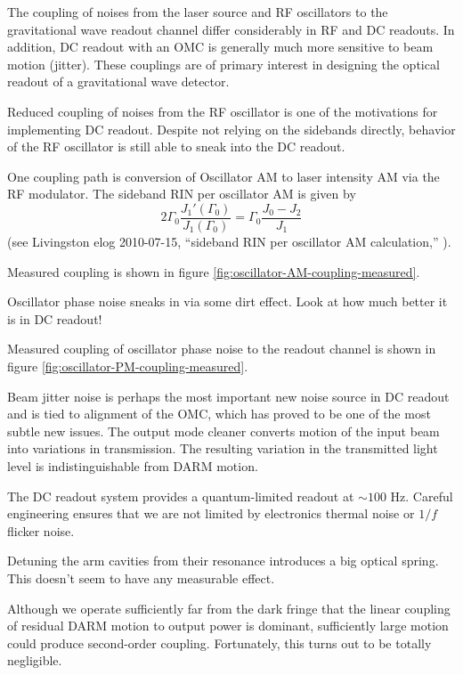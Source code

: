 \label{chapter5}
\doublespace
{}

The coupling of noises from the laser source and RF oscillators to the
gravitational wave readout channel differ considerably in RF and DC
readouts.  In addition, DC readout with an OMC is generally much more
sensitive to beam motion (jitter).  These couplings are of primary
interest in designing the optical readout of a gravitational wave
detector.

%
Reduced coupling of noises from the RF oscillator is one of the motivations
for implementing DC readout. Despite not relying on the sidebands
directly, behavior of the RF oscillator is still able to sneak into
the DC readout. 

One coupling path is conversion of Oscillator AM to laser intensity
AM via the RF modulator. The sideband RIN per oscillator AM is given
by \[
2\Gamma_{0}\frac{J_{1}'(\Gamma_{0})}{J_{1}(\Gamma_{0})}=\Gamma_{0}\frac{J_{0}-J_{2}}{J_{1}}\]
(see Livingston elog 2010-07-15, {}``sideband RIN per oscillator
AM calculation,'' ).

Measured coupling is shown in figure \ref{fig:oscillator-AM-coupling-measured}.


%
Oscillator phase noise sneaks in via some dirt effect. Look at how
much better it is in DC readout!

Measured coupling of oscillator phase noise to the readout channel
is shown in figure \ref{fig:oscillator-PM-coupling-measured}.

%
Beam jitter noise is perhaps the most important new noise source in
DC readout and is tied to alignment of the OMC, which has proved to
be one of the most subtle new issues. The output mode cleaner converts
motion of the input beam into variations in transmission. The resulting
variation in the transmitted light level is indistinguishable from
DARM motion.

%
The DC readout system provides a quantum-limited readout at $\sim100$
Hz. Careful engineering ensures that we are not limited by electronics
thermal noise or $1/f$ flicker noise.

%
Detuning the arm cavities from their resonance introduces a big optical
spring. This doesn't seem to have any measurable effect.

%
Although we operate sufficiently far from the dark fringe that the
linear coupling of residual DARM motion to output power is dominant,
sufficiently large motion could produce second-order coupling. Fortunately,
this turns out to be totally negligible.

